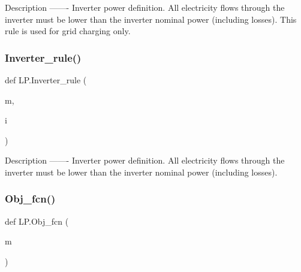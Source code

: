 \begin{DoxyVerb}Description
-------
Inverter power definition. All electricity flows through the inverter must be lower than the inverter nominal power (including losses). This rule is used for grid charging only.
\end{DoxyVerb}
 \mbox{\label{namespace_l_p_ac92c34a0b08510b70b35e0d5c70443ee}} 
\subsubsection{\texorpdfstring{Inverter\+\_\+rule()}{Inverter\_rule()}}
{\footnotesize\ttfamily def L\+P.\+Inverter\+\_\+rule (\begin{DoxyParamCaption}\item[{}]{m,  }\item[{}]{i }\end{DoxyParamCaption})}

\begin{DoxyVerb}Description
-------
Inverter power definition. All electricity flows through the inverter must be lower than the inverter nominal power (including losses).
\end{DoxyVerb}
 \mbox{\label{namespace_l_p_a073ca69e2d3f4650b19e9f703f0e3295}} 
\subsubsection{\texorpdfstring{Obj\+\_\+fcn()}{Obj\_fcn()}}
{\footnotesize\ttfamily def L\+P.\+Obj\+\_\+fcn (\begin{DoxyParamCaption}\item[{}]{m }\end{DoxyParamCaption})}

 \mbox{\label{namespace_l_p_a12fc2729e8471d6cd254664a9bd94390}} 
